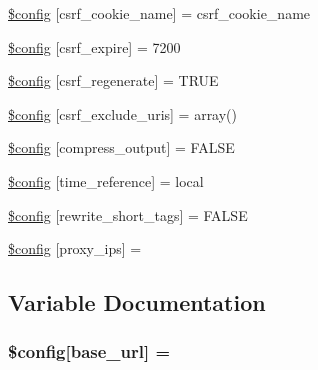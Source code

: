 \begin{DoxyCompactItemize}
\item 
\hyperlink{application_2config_2config_8php_ad8f36090649afb3101c3c337c1d722a1}{\$config} \mbox{[}\textquotesingle{}csrf\+\_\+cookie\+\_\+name\textquotesingle{}\mbox{]} = \textquotesingle{}csrf\+\_\+cookie\+\_\+name\textquotesingle{}
\item 
\hyperlink{application_2config_2config_8php_af5c0ea7b77c40439da4f23b7cbb9c2e4}{\$config} \mbox{[}\textquotesingle{}csrf\+\_\+expire\textquotesingle{}\mbox{]} = 7200
\item 
\hyperlink{application_2config_2config_8php_a5dfd346cc2377cb9dceafc813eb0d801}{\$config} \mbox{[}\textquotesingle{}csrf\+\_\+regenerate\textquotesingle{}\mbox{]} = T\+R\+U\+E
\item 
\hyperlink{application_2config_2config_8php_a9f55fcd2fc65220aa24a95491361b75e}{\$config} \mbox{[}\textquotesingle{}csrf\+\_\+exclude\+\_\+uris\textquotesingle{}\mbox{]} = array()
\item 
\hyperlink{application_2config_2config_8php_a5f03a6c067b921917c2d978f4991bcd1}{\$config} \mbox{[}\textquotesingle{}compress\+\_\+output\textquotesingle{}\mbox{]} = F\+A\+L\+S\+E
\item 
\hyperlink{application_2config_2config_8php_acb20698e35bc3d4b9692a4b4619b1b05}{\$config} \mbox{[}\textquotesingle{}time\+\_\+reference\textquotesingle{}\mbox{]} = \textquotesingle{}local\textquotesingle{}
\item 
\hyperlink{application_2config_2config_8php_a5d2e2b3f3030d1bd97f6d986ef13ace9}{\$config} \mbox{[}\textquotesingle{}rewrite\+\_\+short\+\_\+tags\textquotesingle{}\mbox{]} = F\+A\+L\+S\+E
\item 
\hyperlink{application_2config_2config_8php_a99ce814cf767ce4e281380e6f2158b1b}{\$config} \mbox{[}\textquotesingle{}proxy\+\_\+ips\textquotesingle{}\mbox{]} = \textquotesingle{}\textquotesingle{}
\end{DoxyCompactItemize}


\subsection{Variable Documentation}
\hypertarget{application_2config_2config_8php_a8063081991a9d7087e6aea78db95a524}{}
\subsubsection[{\$config}]{\setlength{\rightskip}{0pt plus 5cm}\$config\mbox{[}\textquotesingle{}base\+\_\+url\textquotesingle{}\mbox{]} = \textquotesingle{}\textquotesingle{}}\label{application_2config_2config_8php_a8063081991a9d7087e6aea78db95a524}
\hypertarget{application_2config_2config_8php_a64d47dc21f6eab24bf747cae9da5e7bb}{}
